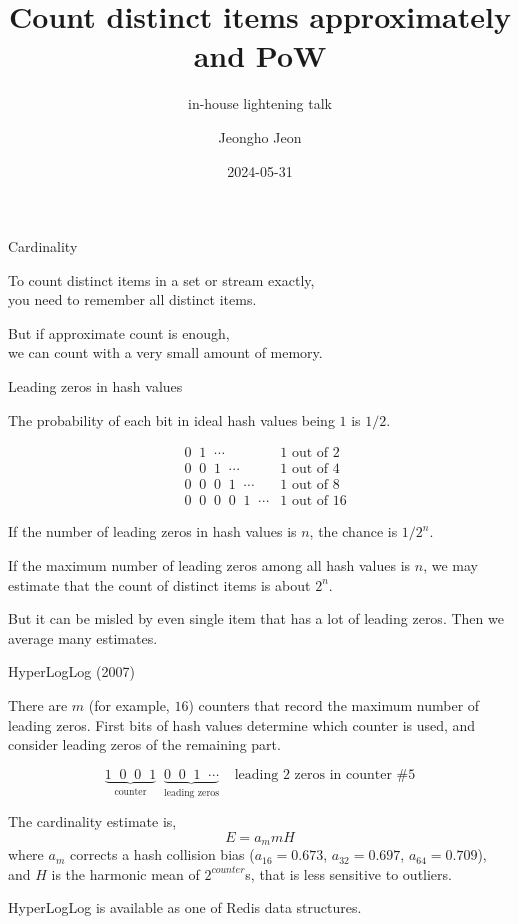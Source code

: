 \documentclass[10pt]{beamer}
\title{Count distinct items approximately and PoW}
\subtitle{in-house lightening talk}
\date{2024-05-31}
\author{Jeongho Jeon}
\institute{DSRV (All That Node, WELLDONE Studio)}
\begin{document}
\maketitle

\begin{frame}[fragile]{Cardinality}

To count distinct items in a set or stream exactly, \\
you need to remember all distinct items.

But if approximate count is enough, \\
we can count with a very small amount of memory.

\end{frame}
\begin{frame}[fragile]{Leading zeros in hash values}

The probability of each bit in ideal hash values being $1$ is $1/2$.

\begin{align*}
& 0 \;\; 1 \;\; \cdots                      & \text{1 out of 2} \\
& 0 \;\; 0 \;\; 1 \;\; \cdots               & \text{1 out of 4} \\
& 0 \;\; 0 \;\; 0 \;\; 1 \;\; \cdots        & \text{1 out of 8} \\
& 0 \;\; 0 \;\; 0 \;\; 0 \;\; 1 \;\; \cdots & \text{1 out of 16}
\end{align*}

If the number of leading zeros in hash values is $n$, the chance is
$1/2^n$.

If the maximum number of leading zeros among all hash values is $n$,
we may estimate that the count of distinct items is about $2^n$.

But it can be misled by even single item that has a lot of leading zeros.
Then we average many estimates.
  
\end{frame}

\begin{frame}[fragile]{HyperLogLog (2007)}

There are $m$ (for example, $16$) counters that record the maximum number
of leading zeros. First bits of hash values determine which counter is
used, and consider leading zeros of the remaining part.

\[
\underbrace{1 \;\; 0 \;\; 0 \;\; 1}_{\text{counter}} \;\;
\underbrace{0 \;\; 0 \;\; 1 \;\; \cdots}_{\text{leading zeros}} \;\;\;\;
\text{leading 2 zeros in counter \#5}
\]

The cardinality estimate is,
\[
E = a_m m H
\]
where $a_m$ corrects a hash collision bias ($a_{16} = 0.673$,
$a_{32} = 0.697$, $a_{64} = 0.709$), and $H$ is the harmonic mean of
$2^{counter}$s, that is less sensitive to outliers.

HyperLogLog is available as one of Redis data structures.

\end{frame}
\end{document}
